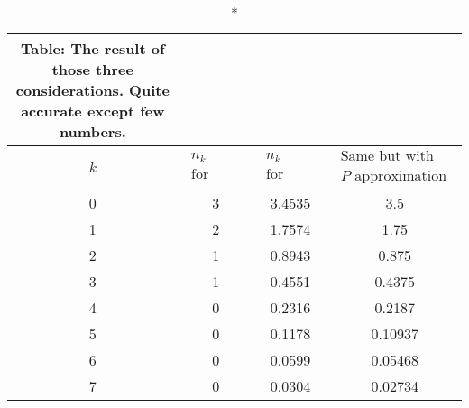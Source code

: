 \documentclass[../../../Main.tex]{subfiles}
\begin{document}
\begin{longtable}{c||c||c||c}
    \caption*{Table: The result of those three considerations. Quite accurate except few numbers.}\\
    \hline\hline
    $k$&$\begin{array}{c}
        n_k\\
        \text{for small system}
    \end{array}$ &$\begin{array}{c}
        n_k\\
        \text{for large system}
    \end{array}$ &$\begin{array}{c}
        \text{Same but with large}\\
        P\text{ approximation}
    \end{array}$\\ 
    \hline\hline
    0 &3&3.4535&3.5 \\
    1 &2&1.7574&1.75 \\
    2 &1&0.8943&0.875 \\
    3 &1&0.4551&0.4375 \\
    4 &0&0.2316&0.2187 \\
    5 &0&0.1178&0.10937 \\
    6 &0&0.0599&0.05468 \\
    7 &0&0.0304&0.02734 \\
\end{longtable}
\end{document}
